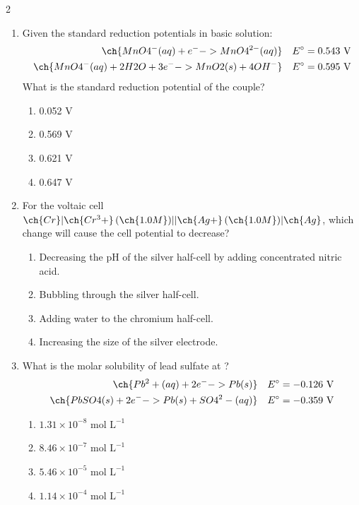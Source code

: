\documentclass[10pt,letterpaper]{article}
\begin{document}
\begin{multicols*}{2}
\begin{enumerate}
    \item Given the standard reduction potentials in basic solution:
    \begin{align*}
        \ch{MnO4^{-}(aq) + e^{-} -> MnO4^{2-}(aq)} &\quad E^\circ = 0.543\text{ V} \\
        \ch{MnO4^{-}(aq) + 2 H2O + 3e^{-} -> MnO2(s) + 4 OH^{-}} &\quad E^\circ = 0.595\text{ V}
    \end{align*}
    What is the standard reduction potential of the  couple?
    \begin{enumerate}[label=(\textsubscript{\Alph*})]
        \item 0.052 V
        \item 0.569 V
        \item 0.621 V
        \item 0.647 V
    \end{enumerate}

    \item For the voltaic cell $\ch{Cr} | \ch{Cr^3+} \, (\ch{1.0 M}) || \ch{Ag+} \, (\ch{1.0 M}) | \ch{Ag}$, which change will cause the cell potential to decrease?
    \begin{enumerate}[label=(\textsubscript{\Alph*})]
        \item Decreasing the pH of the silver half-cell by adding concentrated nitric acid.
        \item Bubbling  through the silver half-cell.
        \item Adding water to the chromium half-cell.
        \item Increasing the size of the silver electrode.
    \end{enumerate}

    \item What is the molar solubility of lead sulfate at ?
    \begin{align*}
        \ch{Pb^2+(aq) + 2e^{-} -> Pb(s)} &\quad E^\circ = -0.126\text{ V} \\
        \ch{PbSO4(s) + 2e^{-} -> Pb(s) + SO4^2-(aq)} &\quad E^\circ = -0.359\text{ V}
    \end{align*}
    \begin{enumerate}[label=(\textsubscript{\Alph*})]
        \item $1.31 \times 10^{-8}\text{ mol L}^{-1}$
        \item $8.46 \times 10^{-7}\text{ mol L}^{-1}$
        \item $5.46 \times 10^{-5}\text{ mol L}^{-1}$
        \item $1.14 \times 10^{-4}\text{ mol L}^{-1}$
    \end{enumerate}


\end{enumerate}
\end{multicols*}
\end{document}
